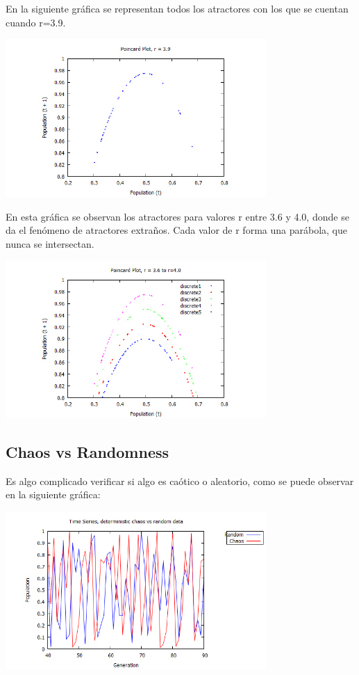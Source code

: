 \documentclass[12pt]{article}
\begin{document}
En la siguiente gráfica se representan todos los atractores con los que se cuentan cuando r=3.9. 

\begin{center}
 \includegraphics[height=6cm]{8.png}
 \end{center}

En esta gráfica se observan los atractores para valores r entre 3.6 y 4.0, donde se da el fenómeno de atractores extraños. Cada valor de r forma una parábola, que nunca se intersectan.

\begin{center}
 \includegraphics[height=6cm]{9.png}
 \end{center}

\subsection{Chaos vs Randomness}

Es algo complicado verificar si algo es caótico o aleatorio, como se puede observar en la siguiente gráfica: 

\begin{center}
 \includegraphics[height=6cm]{10.png}
 \end{center}
\end{document}
